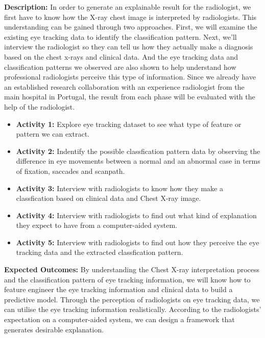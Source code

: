 \textbf{Description:} In order to generate an explainable result for the radiologist, we first have to know how the X-ray chest image is interpreted by radiologists. This understanding can be gained through two approaches. First, we will examine the existing eye tracking data to identify the classification pattern. Next, we'll interview the radiologist so they can tell us how they actually make a diagnosis based on the chest x-rays and clinical data. And the eye tracking data and classification patterns we observed are also shown to help understand how professional radiologists perceive this type of information. Since we already have an established research collaboration with an experience radiologist from the main hospital in Portugal, the result from each phase will be evaluated with the help of the radiologist.

\begin{itemize}
    \item \textbf{Activity 1:} Explore eye tracking dataset to see what type of feature or pattern we can extract.
    \item \textbf{Activity 2:} Indentify the possible classfication pattern data by observing the difference in eye movements between a normal and an abnormal case in terms of fixation, saccades and scanpath.
    \item \textbf{Activity 3:} Interview with radiologists to know how they make a classfication based on clinical data and Chest X-ray image.
    \item \textbf{Activity 4:} Interview with radiologists to find out what kind of explanation they expect to have from a computer-aided system.
    \item \textbf{Activity 5:} Interview with radiologists to find out how they perceive the eye tracking data and the extracted classfication pattern.
\end{itemize}


\textbf{Expected Outcomes:}
By understanding the Chest X-ray interpretation process and the classification pattern of eye tracking information, we will know how to feature engineer the eye tracking information and clinical data to build a predictive model. Through the perception of radiologists on eye tracking data, we can utilise the eye tracking information realistically. According to the radiologists' expectation on a computer-aided system, we can design a framework that generates desirable explanation.

